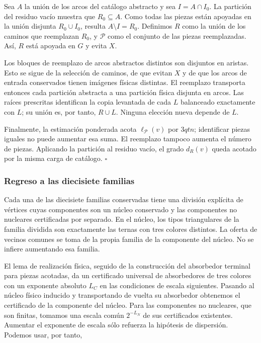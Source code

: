 \documentclass[spanish,11pt,a4paper]{article}
\begin{document}
Sea \(A\) la unión de los arcos del catálogo abstracto y sea \(I=A\cap I_0\). La partición del residuo vacío muestra que \(R_0\subseteq A\). Como todas las piezas están apoyadas en la unión disjunta \(R_0\cup I_0\), resulta \(A\setminus I=R_0\). Definimos \(R\) como la unión de los caminos que reemplazan \(R_0\), y \(\mathcal P\) como el conjunto de las piezas reemplazadas. Así, \(R\) está apoyada en \(G\) y evita \(X\).

Los bloques de reemplazo de arcos abstractos distintos son disjuntos en aristas. Esto se sigue de la selección de caminos, de que evitan \(X\) y de que los arcos de entrada conservados tienen imágenes físicas distintas. El reemplazo transporta entonces cada partición abstracta a una partición física disjunta en arcos. Las raíces prescritas identifican la copia levantada de cada \(L\) balanceado exactamente con \(L\); su unión es, por tanto, \(R\cup L\). Ninguna elección nueva depende de \(L\).

Finalmente, la estimación ponderada acota \(\ell_{\mathcal P}(v)\) por \(3qtn\); identificar piezas iguales no puede aumentar esa suma. El reemplazo tampoco aumenta el número de piezas. Aplicando la partición al residuo vacío, el grado \(d_R(v)\) queda acotado por la misma carga de catálogo. \(\square\)

\subsubsection{Regreso a las diecisiete familias}\label{regreso-a-las-diecisiete-familias}

Cada una de las diecisiete familias conservadas tiene una división explícita de vértices cuyas componentes son un núcleo conservado y las componentes no nucleares certificadas por separado. En el núcleo, los tipos triangulares de la familia dividida son exactamente las ternas con tres colores distintos. La oferta de vecinos comunes se toma de la propia familia de la componente del núcleo. No se infiere aumentando esa familia.

El lema de realización física, seguido de la construcción del absorbedor terminal para piezas acotadas, da un certificado universal de absorbedores de tres colores con un exponente absoluto \(L_C\) en las condiciones de escala siguientes. Pasando al núcleo físico inducido y transportando de vuelta su absorbedor obtenemos el certificado de la componente del núcleo. Para las componentes no nucleares, que son finitas, tomamos una escala común \(2^{-L_N}\) de sus certificados existentes. Aumentar el exponente de escala sólo refuerza la hipótesis de dispersión. Podemos usar, por tanto,
\end{document}
